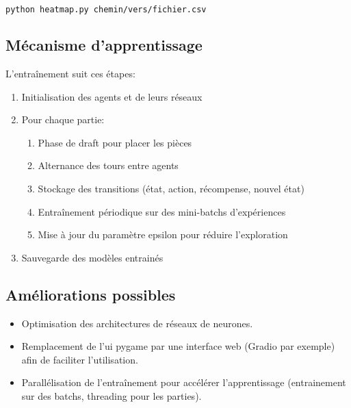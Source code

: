 \documentclass[]{article}
\begin{document}
\begin{lstlisting}[language=bash]
python heatmap.py chemin/vers/fichier.csv
\end{lstlisting}

\subsection{Mécanisme d'apprentissage}
L'entraînement suit ces étapes:

\begin{enumerate}
  \item Initialisation des agents et de leurs réseaux
  \item Pour chaque partie:
    \begin{enumerate}
      \item Phase de draft pour placer les pièces
      \item Alternance des tours entre agents
      \item Stockage des transitions (état, action, récompense, nouvel état)
      \item Entraînement périodique sur des mini-batchs d'expériences
      \item Mise à jour du paramètre epsilon pour réduire l'exploration
    \end{enumerate}
  \item Sauvegarde des modèles entrainés
\end{enumerate}

\subsection{Améliorations possibles}
\begin{itemize}
  \item Optimisation des architectures de réseaux de neurones.
  \item Remplacement de l'ui pygame par une interface web (Gradio par exemple) afin de faciliter l'utilisation.
  \item Parallélisation de l'entraînement pour accélérer l'apprentissage (entrainement sur des batchs, threading pour les parties).
\end{itemize}
\end{document}
